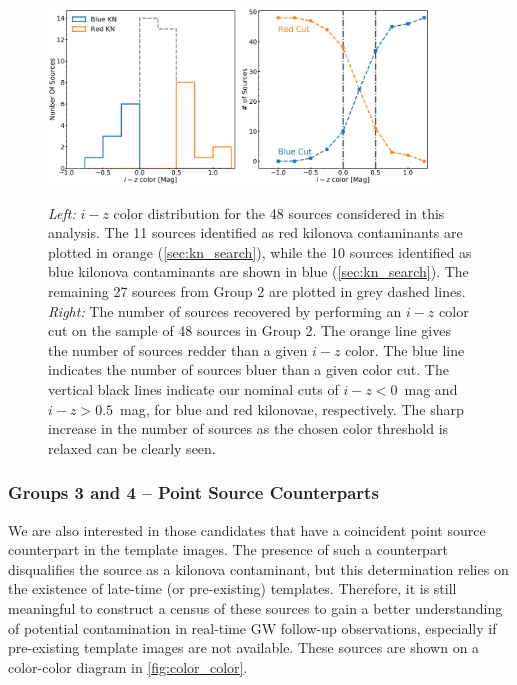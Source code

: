 \begin{figure}[!t]
\begin{center}
\hspace*{-0.1in} 
\scalebox{1.}
{\includegraphics[width=0.9\textwidth]{./figs/chapter3/f3.pdf}}
\caption{{\it Left:} $i-z$ color distribution for the 48 sources considered in this analysis. The 11 sources identified as red kilonova contaminants are plotted in orange (\autoref{sec:kn_search}), while the 10 sources identified as blue kilonova contaminants are shown in blue (\autoref{sec:kn_search}). The remaining 27 sources from Group 2 are plotted in grey dashed lines.
{\it Right:} The number of sources recovered by performing an $i-z$ color cut on the sample of 48 sources in Group 2. The orange line gives the number of sources redder than a given $i-z$ color. The blue line indicates the number of sources bluer than a given color cut. The vertical black lines indicate our nominal cuts of $i-z < 0$~mag and $i-z > 0.5$~mag, for blue and red kilonovae, respectively. The sharp increase in the number of sources as the chosen color threshold is relaxed can be clearly seen.}
\label{fig:color_dist_final}
\end{center}
\end{figure}

\subsubsection{Groups 3 and 4 -- Point Source Counterparts}
\label{sec:pointsources}
We are also interested in those candidates that have a coincident point source counterpart in the template images. The presence of such a counterpart disqualifies the source as a kilonova contaminant, but this determination relies on the existence of late-time (or pre-existing) templates.  Therefore, it is still meaningful to construct a census of these sources to gain a better understanding of potential contamination in real-time GW follow-up observations, especially if pre-existing template images are not available. These sources are shown on a color-color diagram in \autoref{fig:color_color}. 

